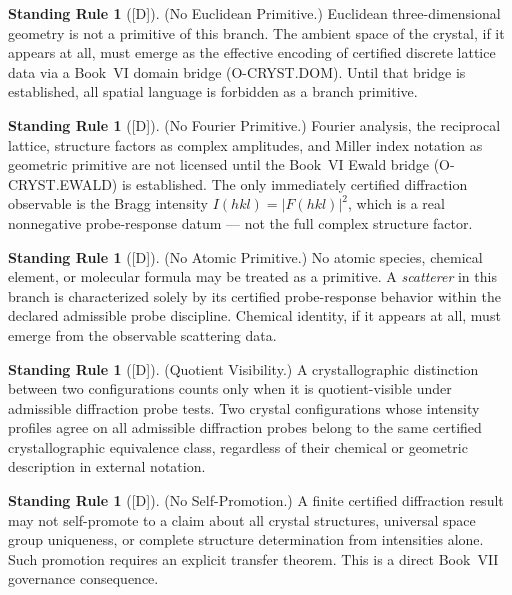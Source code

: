 \documentclass[12pt,oneside]{amsbook}
\theoremstyle{plain}
\theoremstyle{definition}
\newtheorem{standingrule}[theorem]{Standing Rule}
\theoremstyle{remark}
\newcommand{\status}[1]{\textup{[#1]}}
\begin{document}
\begin{standingrule}[\status{D}]\label{sr:cryst-no-euclid}
\textup{(No Euclidean Primitive.)}
Euclidean three-dimensional geometry is not a primitive of this
branch.  The ambient space of the crystal, if it appears at all,
must emerge as the effective encoding of certified discrete lattice
data via a Book~VI domain bridge (O-CRYST.DOM).  Until that bridge
is established, all spatial language is forbidden as a branch
primitive.
\end{standingrule}

\begin{standingrule}[\status{D}]\label{sr:cryst-no-fourier}
\textup{(No Fourier Primitive.)}
Fourier analysis, the reciprocal lattice, structure factors as
complex amplitudes, and Miller index notation as geometric primitive
are not licensed until the Book~VI Ewald bridge (O-CRYST.EWALD)
is established.  The only immediately certified diffraction
observable is the Bragg intensity $I(hkl) = |F(hkl)|^2$, which is
a real nonnegative probe-response datum --- not the full complex
structure factor.
\end{standingrule}

\begin{standingrule}[\status{D}]\label{sr:cryst-no-atom}
\textup{(No Atomic Primitive.)}
No atomic species, chemical element, or molecular formula may
be treated as a primitive.  A \emph{scatterer} in this branch is
characterized solely by its certified probe-response behavior within
the declared admissible probe discipline.  Chemical identity, if it
appears at all, must emerge from the observable scattering data.
\end{standingrule}

\begin{standingrule}[\status{D}]\label{sr:cryst-quotient-visible}
\textup{(Quotient Visibility.)}
A crystallographic distinction between two configurations counts
only when it is quotient-visible under admissible diffraction probe
tests.  Two crystal configurations whose intensity profiles agree
on all admissible diffraction probes belong to the same certified
crystallographic equivalence class, regardless of their chemical
or geometric description in external notation.
\end{standingrule}

\begin{standingrule}[\status{D}]\label{sr:cryst-no-self-promotion}
\textup{(No Self-Promotion.)}
A finite certified diffraction result may not self-promote to a
claim about all crystal structures, universal space group
uniqueness, or complete structure determination from intensities
alone.  Such promotion requires an explicit transfer theorem.
This is a direct Book~VII governance consequence.
\end{standingrule}
\end{document}
